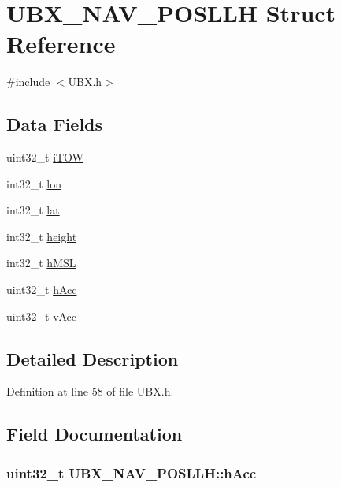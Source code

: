 \hypertarget{struct_u_b_x___n_a_v___p_o_s_l_l_h}{\section{\-U\-B\-X\-\_\-\-N\-A\-V\-\_\-\-P\-O\-S\-L\-L\-H \-Struct \-Reference}
\label{struct_u_b_x___n_a_v___p_o_s_l_l_h}
}


{\ttfamily \#include $<$\-U\-B\-X.\-h$>$}

\subsection*{\-Data \-Fields}
\begin{DoxyCompactItemize}
\item 
uint32\-\_\-t \hyperlink{struct_u_b_x___n_a_v___p_o_s_l_l_h_a85f34b0228c0157d478dfcefef43096f}{i\-T\-O\-W}
\item 
int32\-\_\-t \hyperlink{struct_u_b_x___n_a_v___p_o_s_l_l_h_a754c2e4fe17d3fc6b627416bc1ff2110}{lon}
\item 
int32\-\_\-t \hyperlink{struct_u_b_x___n_a_v___p_o_s_l_l_h_a41a8c2e9da88805da15971d21c633f6f}{lat}
\item 
int32\-\_\-t \hyperlink{struct_u_b_x___n_a_v___p_o_s_l_l_h_acb639227d81a2413277fb492f6b450a0}{height}
\item 
int32\-\_\-t \hyperlink{struct_u_b_x___n_a_v___p_o_s_l_l_h_af78fd4a28f1595624f28d0df15bfcfac}{h\-M\-S\-L}
\item 
uint32\-\_\-t \hyperlink{struct_u_b_x___n_a_v___p_o_s_l_l_h_af3b4eaeb1feedb8295a519b23a76bf83}{h\-Acc}
\item 
uint32\-\_\-t \hyperlink{struct_u_b_x___n_a_v___p_o_s_l_l_h_acd74a5379c0196b551432578f7ef6e4f}{v\-Acc}
\end{DoxyCompactItemize}


\subsection{\-Detailed \-Description}


\-Definition at line 58 of file \-U\-B\-X.\-h.



\subsection{\-Field \-Documentation}
\hypertarget{struct_u_b_x___n_a_v___p_o_s_l_l_h_af3b4eaeb1feedb8295a519b23a76bf83}{
\subsubsection[{h\-Acc}]{\setlength{\rightskip}{0pt plus 5cm}uint32\-\_\-t {\bf \-U\-B\-X\-\_\-\-N\-A\-V\-\_\-\-P\-O\-S\-L\-L\-H\-::h\-Acc}}}\label{struct_u_b_x___n_a_v___p_o_s_l_l_h_af3b4eaeb1feedb8295a519b23a76bf83}


